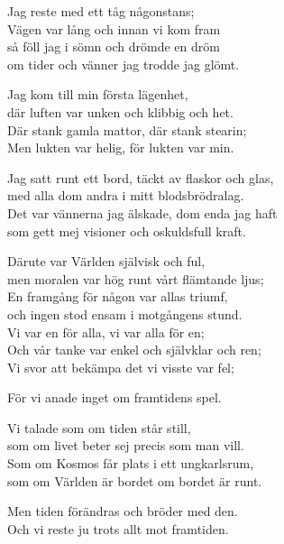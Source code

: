 \vspace{10pt}
Jag reste med ett tåg någonstans;\\
Vägen var lång och innan vi kom fram\\
så föll jag i sömn och drömde en dröm\\
om tider och vänner jag trodde jag glömt.\par
\vspace{10pt}
Jag kom till min första lägenhet,\\
där luften var unken och klibbig och het.\\
Där stank gamla mattor, där stank stearin;\\
Men lukten var helig, för lukten var min.\par
\vspace{10pt}
Jag satt runt ett bord, täckt av flaskor och glas,\\
med alla dom andra i mitt blodsbrödralag.\\
Det var vännerna jag älskade, dom enda jag haft\\
som gett mej visioner och oskuldsfull kraft.\par
\vspace{10pt}
Därute var Världen självisk och ful,\\
men moralen var hög runt vårt flämtande ljus;\\
En framgång för någon var allas triumf,\\
och ingen stod ensam i motgångens stund.\\
Vi var en för alla, vi var alla för en;\\
Och vår tanke var enkel och självklar och ren;\\
Vi svor att bekämpa det vi visste var fel;\par
\vspace{10pt}
För vi anade inget om framtidens spel.\par
\vspace{10pt}
Vi talade som om tiden står still,\\
som om livet beter sej precis som man vill.\\
Som om Kosmos får plats i ett ungkarlsrum,\\
som om Världen är bordet om bordet är runt.\par
\vspace{10pt}
Men tiden förändras och bröder med den.\\
Och vi reste ju trots allt mot framtiden.\\
